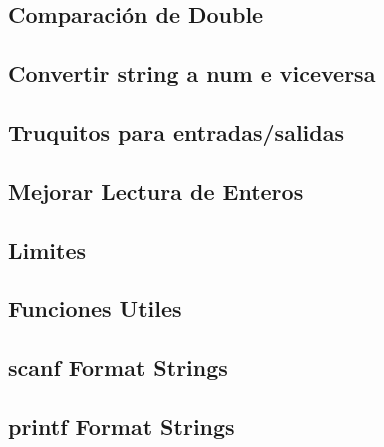 \subsection{Comparaci\'on de Double}

\subsection{Convertir string a num e viceversa}

\subsection{Truquitos para entradas/salidas}

\subsection{Mejorar Lectura de Enteros}

\subsection{Limites}


%
\subsection{Funciones Utiles}

\subsection{scanf Format Strings}

\subsection{printf Format Strings}

